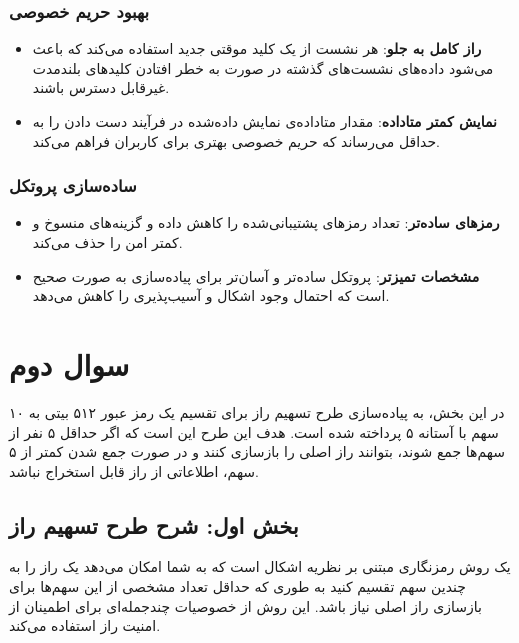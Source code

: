 \documentclass{report}
\begin{document}
\subsubsection*{بهبود حریم خصوصی}
\begin{itemize}[noitemsep]
	\item \textbf{راز کامل به جلو}:
	 هر نشست از یک کلید موقتی جدید استفاده می‌کند که باعث می‌شود داده‌های نشست‌های گذشته در صورت به خطر افتادن کلیدهای بلندمدت غیرقابل دسترس باشند.
	\item \textbf{نمایش کمتر متاداده}:
	 مقدار متاداده‌ی نمایش داده‌شده در فرآیند دست دادن را به حداقل می‌رساند که حریم خصوصی بهتری برای کاربران فراهم می‌کند.
\end{itemize}

\subsubsection*{ساده‌سازی پروتکل}
\begin{itemize}[noitemsep]
	\item \textbf{رمزهای ساده‌تر}:
	 تعداد رمزهای پشتیبانی‌شده را کاهش داده و گزینه‌های منسوخ و کمتر امن را حذف می‌کند.
	\item \textbf{مشخصات تمیزتر}:
	 پروتکل ساده‌تر و آسان‌تر برای پیاده‌سازی به صورت صحیح است که احتمال وجود اشکال و آسیب‌پذیری را کاهش می‌دهد.
\end{itemize}

\section{سوال دوم}

در این بخش، به پیاده‌سازی طرح تسهیم راز  برای تقسیم یک رمز عبور ۵۱۲ بیتی به ۱۰ سهم با آستانه ۵ پرداخته شده است. هدف این طرح این است که اگر حداقل ۵ نفر از سهم‌ها جمع شوند، بتوانند راز اصلی را بازسازی کنند و در صورت جمع شدن کمتر از ۵ سهم، اطلاعاتی از راز قابل استخراج نباشد.

\subsection*{بخش اول: شرح طرح تسهیم راز }
\textbf{}
یک روش رمزنگاری مبتنی بر نظریه اشکال است که به شما امکان می‌دهد یک راز را به چندین سهم تقسیم کنید به طوری که حداقل تعداد مشخصی از این سهم‌ها برای بازسازی راز اصلی نیاز باشد. این روش از خصوصیات چندجمله‌ای برای اطمینان از امنیت راز استفاده می‌کند.
\end{document}
